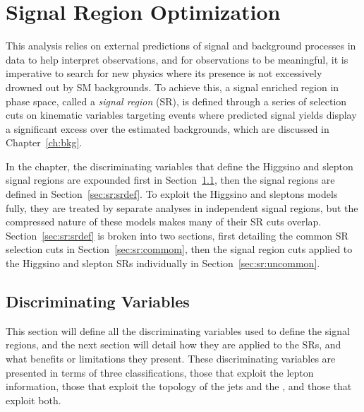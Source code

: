 \chapter{Signal Region Optimization}
 \label{ch:sr}
This analysis relies on external predictions of signal and background processes in data to help interpret observations, and for observations to be meaningful, it is imperative to search for new physics where its presence is not excessively drowned out by SM backgrounds.  To achieve this, a signal enriched region in phase space, called a \textit{signal region} (SR), is defined through a series of selection cuts on kinematic variables targeting events where predicted signal yields display a significant excess over the estimated backgrounds, which are discussed in Chapter~\ref{ch:bkg}.   
 
In the chapter, the discriminating variables that define the Higgsino and slepton signal regions are expounded first in Section~\ref{sec:sr:discvar}, then the signal regions are defined in Section~\ref{sec:sr:srdef}.  To exploit the Higgsino and sleptons models fully, they are treated by separate analyses in independent signal regions, but the compressed nature of these models makes many of their SR cuts overlap.  Section~\ref{sec:sr:srdef} is broken into two sections, first detailing the common SR selection cuts in Section~\ref{sec:sr:commom}, then the signal region cuts applied to the Higgsino and slepton SRs individually in Section~\ref{sec:sr:uncommon}. 
 
\section{Discriminating Variables}
\label{sec:sr:discvar}
This section will define all the discriminating variables used to define the signal regions, and the next section will detail how they are applied to the SRs, and what benefits or limitations they present.  These discriminating variables are presented in terms of three classifications, those that exploit the lepton information, those that exploit the topology of the jets and the \met{}, and those that exploit both.  

